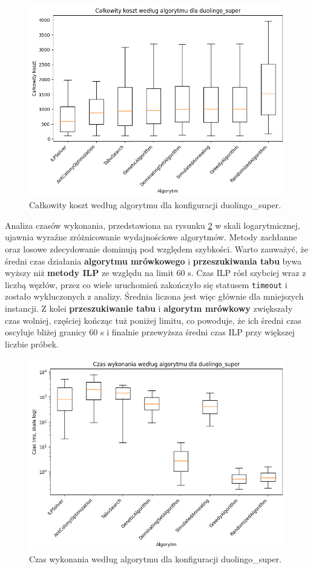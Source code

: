 \begin{figure}[H]
  \centering
  \includegraphics[width=0.7\linewidth]{assets/figures/synthetic_cost_boxplot.png}
  \caption{Całkowity koszt według algorytmu dla konfiguracji duolingo\_super.}
  \label{fig:synthetic_cost_boxplot}
\end{figure}

Analiza czasów wykonania, przedstawiona na rysunku \ref{fig:synthetic_time_boxplot} w skali logarytmicznej, ujawnia wyraźne zróżnicowanie wydajnościowe algorytmów. Metody zachłanne oraz losowe zdecydowanie dominują pod względem szybkości. Warto zauważyć, że średni czas działania \textbf{algorytmu mrówkowego} i \textbf{przeszukiwania tabu} bywa wyższy niż \textbf{metody ILP} ze względu na limit 60 s. Czas ILP rósł szybciej wraz z liczbą węzłów, przez co wiele uruchomień zakończyło się statusem \texttt{timeout} i zostało wykluczonych z analizy. Średnia liczona jest więc głównie dla mniejszych instancji. Z kolei \textbf{przeszukiwanie tabu} i \textbf{algorytm mrówkowy} zwiększały czas wolniej, częściej kończąc tuż poniżej limitu, co powoduje, że ich średni czas oscyluje bliżej granicy 60 s i finalnie przewyższa średni czas ILP przy większej liczbie próbek.

\begin{figure}[H]
  \centering
  \includegraphics[width=0.7\linewidth]{assets/figures/synthetic_time_boxplot.png}
  \caption{Czas wykonania według algorytmu dla konfiguracji duolingo\_super.}
  \label{fig:synthetic_time_boxplot}
\end{figure}

